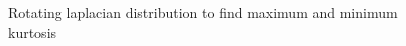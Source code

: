 \documentclass[a4paper,english]{article}
\begin{document}
\begin{figure}
\caption{Rotating laplacian distribution to find maximum and minimum kurtosis}
\end{figure}

\begin{figure}
\centering
{}\qquad
{} \\

\end{figure}
\end{document}
